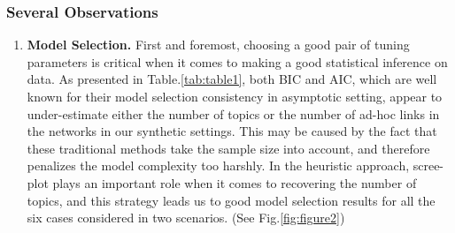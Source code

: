 \documentclass[AMS,STIX1COL]{WileyNJD-v2}
\begin{document}
{\subsubsection{Several Observations}
\begin{enumerate}
    \item \textbf{Model Selection.}
    First and foremost, choosing a good pair of tuning parameters is critical when it comes to making a good statistical inference on data.
    As presented in Table.\ref{tab:table1}, both BIC and AIC, which are well known for their model selection consistency in asymptotic setting, appear to under-estimate either the number of topics or the number of ad-hoc links in the networks in our synthetic settings. This may be caused by the fact that these traditional methods take the sample size into account, and therefore penalizes the model complexity too harshly.
    In the heuristic approach, scree-plot plays an important role when it comes to recovering the number of topics, and this strategy leads us to good model selection results for all the six cases considered in two scenarios. (See Fig.\ref{fig:figure2})


\end{enumerate}}
\end{document}
